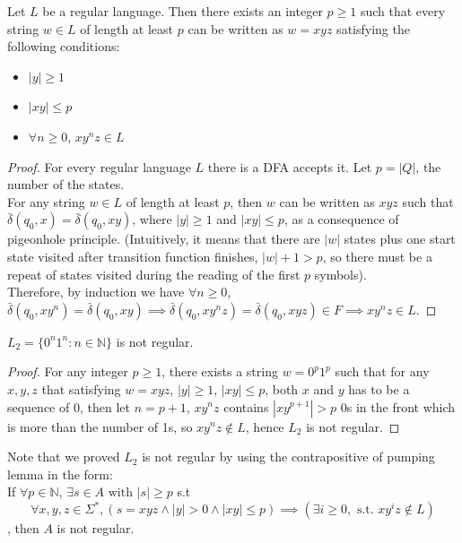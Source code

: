 \begin{lemma}
Let $L$ be a regular language. Then there exists an integer $p \ge 1$ such that every string $w \in L$ of length at least $p$ can be written as $w = xyz$ satisfying the following conditions:
\begin{itemize}
    \item $|y| \ge 1$
    \item $|xy| \le p$
    \item $\forall n\ge 0$, $xy^{n}z \in L$
\end{itemize}
\end{lemma}
\begin{proof}
For every regular language $L$ there is a DFA accepts it. Let $p = |Q|$, the number of the states. 
\\ For any string $w \in L$ of length at least $p$, then $w$ can be written as $xyz$ such that $\bar{\delta}(q_0,x) = \bar{\delta}(q_0,xy)$, where $|y| \ge 1$ and $|xy|\le p$, as a consequence of pigeonhole principle. (Intuitively, it means that there are $|w|$ states plus one start state visited after transition function finishes, $|w|+1 > p$, so there must be a repeat of states visited during the reading of the first $p$ symbols).
\\ Therefore, by induction we have $\forall n \ge 0$, $\bar{\delta}(q_0,xy^{n}) = \bar{\delta}(q_0,xy) \implies \bar{\delta}(q_0,xy^{n}z) = \bar{\delta}(q_0,xyz) \in F \implies xy^{n}z \in L$.
\end{proof}

\begin{corollary}
    $L_2 = \{ 0^{n}1^{n} : n \in \mathbb{N} \}$ is not regular.
\end{corollary}
\begin{proof}
    For any integer $p\ge 1$, there exists a string $w = 0^{p}1^{p}$ such that for any $x,y,z$ that satisfying $w=xyz$, $|y| \ge 1$, $|xy| \le p$, both $x$ and $y$ has to be a sequence of 0, then let $n = p+1$, $xy^{n}z$ contains $|xy^{p+1}| > p$ 0s in the front which is more than the number of 1s, so $xy^{n}z \not \in L$, hence $L_2$ is not regular.
\end{proof}

\begin{remark}
Note that we proved $L_2$ is not regular by using the contrapositive of pumping lemma in the form:
\\
    If $\forall p \in \mathbb{N}$, $\exists s \in A \text{ with } |s|\ge p$ s.t \\
    $$
    \forall x,y,z \in \Sigma^{*}, (s=xyz \land |y| > 0 \land |xy|\le p) \implies (\exists i \ge 0, \text{ s.t. } xy^iz \notin L)
    $$,
    then $A$ is not regular.
\end{remark}

